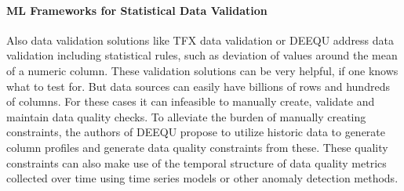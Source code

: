 \paragraph{ML Frameworks for Statistical Data Validation}
Also data validation solutions like TFX data validation \cite{Breck2019} or DEEQU \cite{Schelter2018} address data validation including statistical rules, such as deviation of values around the mean of a numeric column. These validation solutions can be very helpful, if one knows what to test for. But data sources can easily have billions of rows and hundreds of columns. For these cases it can infeasible to manually create, validate and maintain data quality checks. To alleviate the burden of manually creating constraints, the authors of DEEQU \cite{Schelter2018} propose to utilize historic data to generate column profiles and generate data quality constraints from these. These quality constraints can also make use of the temporal structure of data quality metrics collected over time using time series models or other anomaly detection methods.

